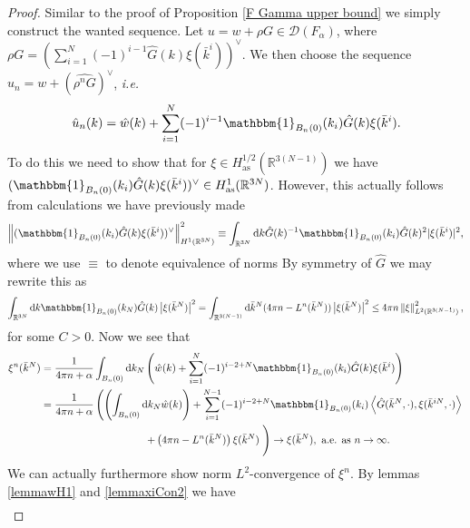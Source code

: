 \documentclass[a4paper,11pt]{article}
\newcommand{\norm}[1]{\left\lVert #1 \right\rVert}
\newcommand{\abs}[1]{\left\lvert #1 \right\rvert}
\newcommand{\dom}[1]{\mathscr D\left(#1\right)}
\renewcommand{\braket}[1]{\left\langle#1\right\rangle}
\newcommand*\diff{\mathop{}\!\mathrm{d}}
\newcommand{\ie}{\emph{i.e.} }
\newcommand{\R}{\mathbb{R}}
\numberwithin{equation}{section}
\begin{document}
\begin{proof}
	Similar to the proof of Proposition \ref{F Gamma upper bound} we simply construct the wanted sequence. Let $ u=w+\rho G \in\dom{F_\alpha}$, where $ \rho G=\left(\sum_{i=1}^{N}(-1)^{i-1}\hat{G}(k)\xi(\bar{k}^i)\right)^\vee $. We then choose the sequence $ u_n=w+(\widehat{\rho^nG})^\vee $, \ie\begin{equation}
	\hat{u}_n(k)=\hat{w}(k)+\sum_{i=1}^{N}(-1)^{i-1}\mathbbm{1}_{B_n(0)}(k_i)\hat{G}(k)\xi(\bar{k}^i).
	\end{equation}
	To do this we need to show that for $ \xi\in H_{\text{as}}^{1/2}(\R^{3(N-1)}) $ we have $ (\mathbbm{1}_{B_n(0)}(k_i)\hat{G}(k)\xi(\bar{k}^i))^\vee \in H_{\text{as}}^1(\R^{3N}) $. However, this actually follows from calculations we have previously made\begin{equation}
	\norm{(\mathbbm{1}_{B_n(0)}(k_i)\hat{G}(k)\xi(\bar{k}^i))^\vee}_{H^1(\R^{3N})}^2\equiv\int_{\R^{3N}}\diff k \hat{G}(k)^{-1}\mathbbm{1}_{B_n(0)}(k_i)\hat{G}(k)^2\lvert\xi(\bar{k}^i)\rvert^2,
	\end{equation}
	where we use $ \equiv $ to denote equivalence of norms
	By symmetry of $ \hat{G} $ we may rewrite this as\begin{equation}
	\int_{\R^{3N}}\diff k \mathbbm{1}_{B_n(0)}(k_N)\hat{G}(k)\abs{\xi(\bar{k}^N)}^2=\int_{\R^{3(N-1)}}\diff\bar{k}^N(4\pi n-L^n(\bar{k}^N))\abs{\xi(\bar{k}^N)}^2\leq 4\pi n \norm{\xi}_{L^{2}(\R^{3(N-1)})}^2,
	\end{equation}
	for some $ C>0 $. Now we see that \begin{equation}
	\begin{aligned}
	\xi^n(\bar{k}^N)&=\frac{1}{4\pi n+\alpha}\int_{B_n(0)}\diff k_N \left(\hat{w}(k)+\sum_{i=1}^{N}(-1)^{i-2+N}\mathbbm{1}_{B_n(0)}(k_i)\hat{G}(k)\xi(\bar{k}^i)\right)\\
	&=\frac{1}{4\pi n+\alpha}\left(\left(\int_{B_n(0)}\diff k_N \hat{w}(k)\right)+\sum_{i=1}^{N-1}(-1)^{i-2+N}\mathbbm{1}_{B_n(0)}(k_i)\braket{\hat{G}(\bar{k}^N,\cdot),\xi(\bar{k}^{iN},\cdot)}\right.\\
	&\left.\qquad\qquad\qquad\qquad\qquad+\left(4\pi n-L^n(\bar{k}^N)\right)\xi(\bar{k}^N)\right.\Bigg)\to \xi(\bar{k}^N),\text{ a.e. as }n\to\infty.
	\end{aligned}
	\end{equation}
	We can actually furthermore show norm $ L^2 $-convergence of $ \xi^n $. By lemmas \ref{lemmawH1} and \ref{lemmaxiCon2} we have \begin{equation}\label{xiConvergence}
	\begin{aligned}

\end{aligned}
\end{equation}
\end{proof}
\end{document}
